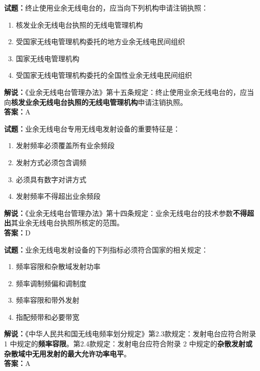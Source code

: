 \documentclass{ctexbook}
\begin{document}
\bigskip




\noindent\textbf{试题：}终止使用业余无线电台的，应当向下列机构申请注销执照：
\begin{enumerate}[leftmargin=3em]
\item 核发业余无线电台执照的无线电管理机构
\item 受国家无线电管理机构委托的地方业余无线电民间组织
\item 国家无线电管理机构
\item 受国家无线电管理机构委托的全国性业余无线电民间组织
\end{enumerate}
\noindent\textbf{解说：}《业余无线电台管理办法》第十五条规定：终止使用业余无线电台的，应当向\textbf{核发业余无线电台执照的无线电管理机构}申请注销执照。\\\noindent\textbf{答案：}A

\bigskip




\noindent\textbf{试题：}业余无线电台专用无线电发射设备的重要特征是：
\begin{enumerate}[leftmargin=3em]
\item 发射频率必须覆盖所有业余频段
\item 发射方式必须包含调频
\item 必须具有数字对讲方式
\item 发射频率不得超出业余频段
\end{enumerate}
\noindent\textbf{解说：}《业余无线电台管理办法》第十四条规定：业余无线电台的技术参数\textbf{不得超出}其业余无线电台执照所核定的范围。\\\noindent\textbf{答案：}D

\bigskip




\noindent\textbf{试题：}业余无线电发射设备的下列指标必须符合国家的相关规定：
\begin{enumerate}[leftmargin=3em]
\item 频率容限和杂散域发射功率
\item 频率调制频偏和调制度
\item 频率容限和带外发射
\item 指配频带和必要带宽
\end{enumerate}
\noindent\textbf{解说：}《中华人民共和国无线电频率划分规定》第2.3款规定：发射电台应符合附录 1 中规定的\textbf{频率容限}。第2.4款规定：发射电台应符合附录 2 中规定的\textbf{杂散发射或杂散域中无用发射的最大允许功率电平}。\\\noindent\textbf{答案：}A
\end{document}
